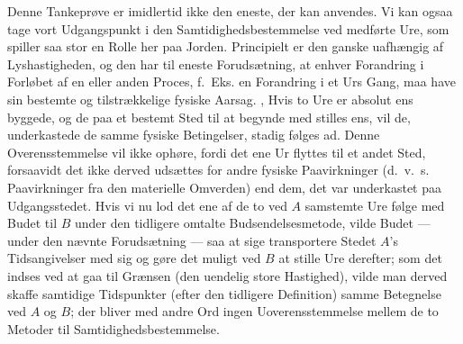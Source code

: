 \documentclass[12pt,a4paper]{article}
\begin{document}
Denne Tankeprøve er imidlertid ikke den eneste, der kan anvendes. Vi kan ogsaa
tage vort Udgangspunkt i den Samtidighedsbestemmelse ved medførte Ure, som
spiller saa stor en Rolle her paa Jorden. Principielt er den ganske uafhængig
af Lyshastigheden, og den har til eneste Forudsætning, at enhver Forandring i
Forløbet af en eller anden Proces, f.~Eks. en Forandring i et Urs Gang, maa
have sin bestemte og tilstrækkelige fysiske Aarsag. , Hvis to Ure er absolut
ens byggede, og de paa et bestemt Sted til at begynde med stilles ens, vil de,
underkastede de samme fysiske Betingelser, stadig følges ad. Denne
Overensstemmelse vil ikke ophøre, fordi det ene Ur flyttes til et andet Sted,
forsaavidt det ikke derved udsættes for andre fysiske Paavirkninger (d.~v.~s.
Paavirkninger fra den materielle Omverden) end dem, det var underkastet paa
Udgangsstedet. Hvis vi nu lod det ene af de to ved $A$ samstemte Ure følge med
Budet til $B$ under den tidligere omtalte Budsendelsesmetode, vilde Budet ---
under den nævnte Forudsætning --- saa at sige transportere Stedet $A$'s
Tidsangivelser med sig og gøre det muligt ved $B$ at stille Ure derefter; som
det indses ved at gaa til Grænsen (den uendelig store Hastighed), vilde man
derved skaffe samtidige Tidspunkter (efter den tidligere Definition) samme
Betegnelse ved $A$ og $B$; der bliver med andre Ord ingen Uoverensstemmelse
mellem de to Metoder til Samtidighedsbestemmelse.
\end{document}
